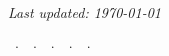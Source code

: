 
\pagestyle{plain}

{
    \centering
    {
        {
            \LARGE\scshape\color{Maroon}{\MakeTextLowercase\name{}}\\
        }
        \bigskip
        \textit{Last updated: \today{}}
        \bigskip
    }

    \department~$\cdot$~\university~$\cdot$~\city~$\cdot$~\state~$\cdot$~\country~$\cdot$~\zipcode

    \faEnvelope~~\texttt{\href{mailto:\myemail}{\myemail}}\hspace{0.3in}\faGlobe~~\texttt{\href{\myweb}{\myweb}}

    \bigskip
    \medskip
}
